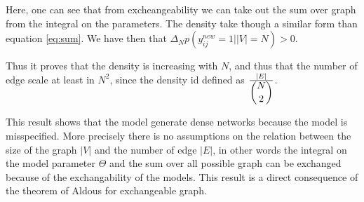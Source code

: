 \documentclass[a4paper, 12pt]{article}
\begin{document}

Here, one can see that from excheangeability we can take out the sum over graph from the integral on the parameters. The density take though a similar form than equation  \eqref{eq:sum}. We have then that $\Delta_N p(y_{ij}^{new}=1| |V|=N) >0 $.

Thus it proves that the density is increasing with $N$, and thus that the number of edge scale at least in $N^2$, since the density id defined as $\frac{|E|}{\dbinom{N}{2}}$. 

This result shows that the model generate dense networks because the model is misspecified. More precisely there is no assumptions on the relation between the size of the graph $|V|$ and the number of edge $|E|$, in other words the integral on the model parameter $\Theta$ and the sum over all possible graph can be exchanged because of the exchangability of the models. This result is a direct consequence of the theorem of Aldous for exchangeable graph.
\end{document}
